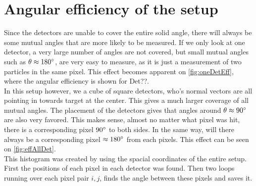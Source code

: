 \section{Angular efficiency of the setup}
Since the detectors are unable to cover the entire solid angle, there will always be some mutual angles that are more likely to be measured. 
If we only look at one detector, a very large number of angles are not covered, but small mutual angles such as $\theta \approx 180\degree$, are very easy to measure, as it is just a measurement of two particles in the same pixel. 
This effect becomes apparent on \cref{fig:oneDetEff}, where the angular efficiency is shown for Det??. \\
In this setup however, we a cube of square detectors, who's normal vectors are all pointing in towards target at the center. This gives a much larger coverage of all mutual angles. 
The placement of the detectors gives that angles around $\theta \approx 90 \degree$ are also very favored. This makes sense, almost no matter what pixel was hit, there is a corresponding pixel $90\degree$ to both sides. In the same way, will there always be a corresponding pixel $\approx 180\degree$ from each pixels. This effect can be seen on \cref{fig:effAllDet}. \\
This histogram was created by using the spacial coordinates of the entire setup. First the positions of each pixel in each detector was found. Then two loops running over each pixel pair $i, j$, finds the angle between these pixels and saves it.\\

